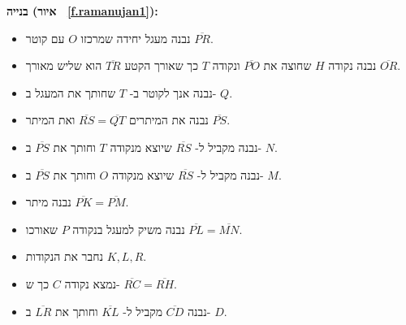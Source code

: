 \textbf{בנייה (איור%
~\ref{f.ramanujan1}):}
\begin{itemize}
\item
נבנה מעגל יחידה שמרכזו 
$O$
עם קוטר
$\overline{PR}$.
\item
נבנה נקודה
$H$
שחוצה את
$\overline{PO}$
ונקודה
$T$
כך שאורך הקטע %
$\overline{TR}$
הוא שליש מאורך 
$\overline{OR}$.
\item
נבנה אנך לקוטר ב-%
$T$
שחותך את המעגל ב-%
$Q$.
\item
נבנה את המיתרים
$\overline{RS}=\overline{QT}$
ואת המיתר %
$\overline{PS}$.
\item
נבנה מקביל ל-%
$\overline{RS}$
שיוצא מנקודה%
$T$
וחותך את
$\overline{PS}$
ב-%
$N$.
\item
נבנה מקביל ל-%
$\overline{RS}$
שיוצא מנקודה%
$O$
וחותך את
$\overline{PS}$
ב-%
$M$.
\item
נבנה מיתר
$\overline{PK}=\overline{PM}$.
\item
נבנה משיק למעגל בנקודה %
$P$
שאורכו
$\overline{PL}=\overline{MN}$.
\item
נחבר את הנקודות
$K,L,R$.
\item
נמצא נקודה 
$C$
כך ש-%
$\overline{RC}=\overline{RH}$.
\item
נבנה 
$\overline{CD}$
מקביל ל-%
$\overline{KL}$
וחותך את
$\overline{LR}$ 
ב-%
$D$. 
\end{itemize}

